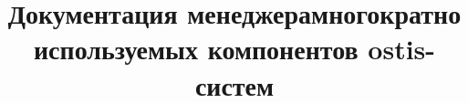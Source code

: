 \documentclass{scndocument}%
\begin{document}
\DeactivateBG
\title{\centering
Документация менеджерамногократно используемых компонентов ostis-систем}
\author{}
\maketitle

\normalsize

\setcounter{page}{3}

\ActivateBG
\begin{SCn}

\end{SCn}
\end{document}
